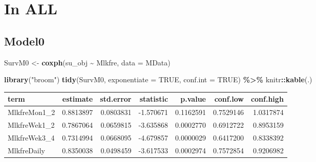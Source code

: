 \documentclass[
]{article}
\newenvironment{Shaded}{\begin{snugshade}}{\end{snugshade}}
\newcommand{\DataTypeTok}[1]{\textcolor[rgb]{0.13,0.29,0.53}{#1}}
\newcommand{\KeywordTok}[1]{\textcolor[rgb]{0.13,0.29,0.53}{\textbf{#1}}}
\newcommand{\NormalTok}[1]{#1}
\newcommand{\OperatorTok}[1]{\textcolor[rgb]{0.81,0.36,0.00}{\textbf{#1}}}
\newcommand{\OtherTok}[1]{\textcolor[rgb]{0.56,0.35,0.01}{#1}}
\newcommand{\StringTok}[1]{\textcolor[rgb]{0.31,0.60,0.02}{#1}}
\begin{document}
\hypertarget{in-all}{%
\section{In ALL}\label{in-all}}

\hypertarget{model0}{%
\subsection{Model0}\label{model0}}

\begin{Shaded}
\begin{Highlighting}[]
\NormalTok{SurvM0 \textless{}{-}}\StringTok{  }\KeywordTok{coxph}\NormalTok{(su\_obj }\OperatorTok{\textasciitilde{}}\StringTok{ }\NormalTok{Mlkfre, }
                 \DataTypeTok{data =}\NormalTok{ MData)}

\KeywordTok{library}\NormalTok{(}\StringTok{"broom"}\NormalTok{)}
\KeywordTok{tidy}\NormalTok{(SurvM0, }\DataTypeTok{exponentiate =} \OtherTok{TRUE}\NormalTok{, }\DataTypeTok{conf.int =} \OtherTok{TRUE}\NormalTok{) }\OperatorTok{\%\textgreater{}\%}\StringTok{ }
\StringTok{  }\NormalTok{knitr}\OperatorTok{::}\KeywordTok{kable}\NormalTok{(.)}
\end{Highlighting}
\end{Shaded}

\begin{longtable}[]{@{}lrrrrrr@{}}
\toprule
term & estimate & std.error & statistic & p.value & conf.low &
conf.high\tabularnewline
\midrule
\endhead
MlkfreMon1\_2 & 0.8813897 & 0.0803831 & -1.570671 & 0.1162591 &
0.7529146 & 1.0317874\tabularnewline
MlkfreWek1\_2 & 0.7867064 & 0.0659815 & -3.635868 & 0.0002770 &
0.6912722 & 0.8953159\tabularnewline
MlkfreWek3\_4 & 0.7314994 & 0.0668095 & -4.679857 & 0.0000029 &
0.6417200 & 0.8338392\tabularnewline
MlkfreDaily & 0.8350038 & 0.0498459 & -3.617533 & 0.0002974 & 0.7572854
& 0.9206982\tabularnewline
\bottomrule
\end{longtable}

\begin{Shaded}
\end{Shaded}
\end{document}
